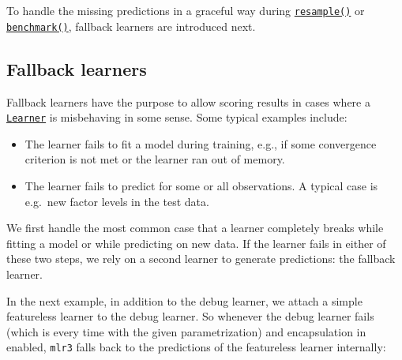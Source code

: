 \documentclass[]{scrbook}
\newenvironment{Shaded}{\begin{snugshade}}{\end{snugshade}}
\newcommand{\DataTypeTok}[1]{\textcolor[rgb]{0.13,0.29,0.53}{#1}}
\newcommand{\DecValTok}[1]{\textcolor[rgb]{0.00,0.00,0.81}{#1}}
\newcommand{\KeywordTok}[1]{\textcolor[rgb]{0.13,0.29,0.53}{\textbf{#1}}}
\newcommand{\NormalTok}[1]{#1}
\newcommand{\OperatorTok}[1]{\textcolor[rgb]{0.81,0.36,0.00}{\textbf{#1}}}
\newcommand{\StringTok}[1]{\textcolor[rgb]{0.31,0.60,0.02}{#1}}
\providecommand{\tightlist}{%
  \setlength{\itemsep}{0pt}\setlength{\parskip}{0pt}}
\renewenvironment{Shaded} {\begin{snugshade}\small} {\end{snugshade}}
\begin{document}
To handle the missing predictions in a graceful way during \href{https://mlr3.mlr-org.com/reference/resample.html}{\texttt{resample()}} or \href{https://mlr3.mlr-org.com/reference/benchmark.html}{\texttt{benchmark()}}, fallback learners are introduced next.

\hypertarget{fallback-learners}{%
\subsection{Fallback learners}\label{fallback-learners}}

Fallback learners have the purpose to allow scoring results in cases where a \href{https://mlr3.mlr-org.com/reference/Learner.html}{\texttt{Learner}} is misbehaving in some sense.
Some typical examples include:

\begin{itemize}
\tightlist
\item
  The learner fails to fit a model during training, e.g., if some convergence criterion is not met or the learner ran out of memory.
\item
  The learner fails to predict for some or all observations.
  A typical case is e.g.~new factor levels in the test data.
\end{itemize}

We first handle the most common case that a learner completely breaks while fitting a model or while predicting on new data.
If the learner fails in either of these two steps, we rely on a second learner to generate predictions: the fallback learner.

In the next example, in addition to the debug learner, we attach a simple featureless learner to the debug learner.
So whenever the debug learner fails (which is every time with the given parametrization) and encapsulation in enabled, \texttt{mlr3} falls back to the predictions of the featureless learner internally:

\begin{Shaded}
\end{Shaded}
\end{document}
